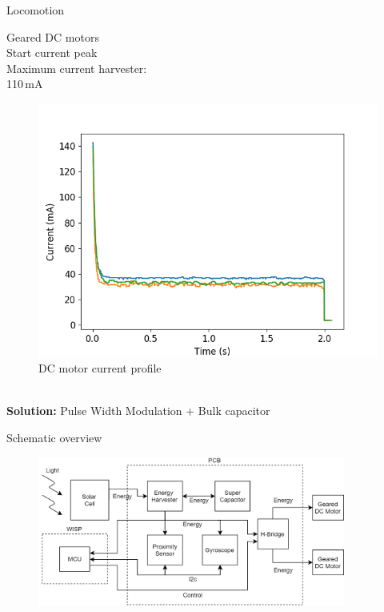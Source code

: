 \documentclass{beamer}
\begin{document}
\begin{frame}{Locomotion}
	\begin{minipage}{0.45\textwidth}
		Geared DC motors \\
		
		Start current peak \\
		
		Maximum current harvester: \\
		110\,mA
	\end{minipage}
	\begin{minipage}{0.54\textwidth}\raggedleft
		\begin{figure}
			\includegraphics[width=\textwidth]{pics/free_running_current.png}
			\caption*{DC motor current profile}
		\end{figure}
	\end{minipage} \\
	\pause
	\vspace{1em}
	\textbf{Solution:} Pulse Width Modulation + Bulk capacitor
\end{frame}

\begin{frame}{Schematic overview}
	\begin{figure}
		\centering
		\includegraphics[width=0.9\textwidth]{pics/schematic_robot_v2.png}
	\end{figure}
\end{frame}
\end{document}
